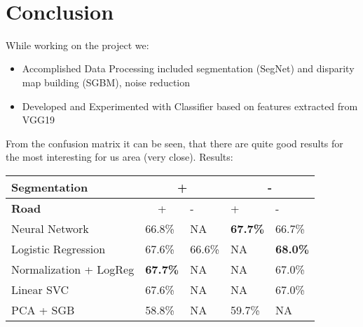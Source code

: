 \documentclass{article}
\begin{document}
    
    \begin{center}
    \end{center}
    { \hspace*{\fill} \\}
    
    \section{Conclusion}\label{conclusion}

   While working on the project we:
	
	\begin{itemize}
		\item Accomplished Data Processing included segmentation (SegNet) and disparity map building (SGBM), noise reduction
		\item Developed and Experimented with Classifier based on features extracted from VGG19
 
	\end{itemize}
	 From the confusion matrix it can be seen, that there are quite good results for the most interesting for us area (very close). 
	Results:
	
	\begin{table}
\begin{tabular}{|l|l|l|l|l|} 
\hline 
\textbf{Segmentation }& \multicolumn{2}{c|}{+} & \multicolumn{2}{c|}{-} \\
\hline 
\textbf{Road} & \multicolumn{1}{c|}{+} & - & + & - \\ 
\hline 
Neural Network & 66.8\% & NA & \textbf{67.7\%} & 66.7\% \\ 
\hline 
Logistic Regression & 67.6\% & 66.6\% & NA & \textbf{68.0\%} \\ 
\hline 
Normalization + LogReg & \textbf{67.7\%} & NA & NA & 67.0\% \\ 
\hline 
Linear SVC & 67.6\% & NA & NA & 67.0\% \\ 
\hline 
PCA + SGB & 58.8\% & NA & 59.7\% & NA \\ 
\hline 
\end{tabular}
\end{table}
\end{document}
